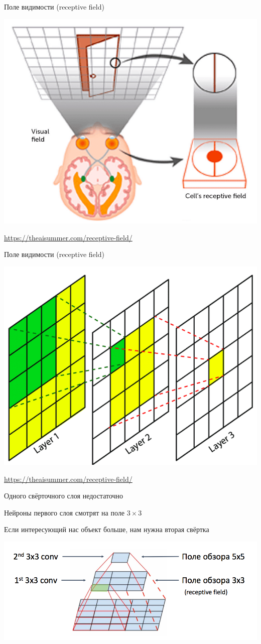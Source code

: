 \documentclass[notes,12pt, aspectratio=169]{beamer}
\newenvironment{wideitemize}{\itemize\addtolength{\itemsep}{10pt}}{\enditemize}
\begin{document}
\begin{frame}{Поле видимости (receptive field)}
\begin{center}
	\includegraphics[width=.5\linewidth]{Visual-human-system.png}
\end{center}
\vfill %
\footnotesize
\color{blue} \url{https://theaisummer.com/receptive-field/}
\end{frame}


\begin{frame}{Поле видимости (receptive field)}
\begin{center}
	\includegraphics[width=.5\linewidth]{receptive-field-in-convolutional-networks.png}
\end{center}
\vfill %
\footnotesize
\color{blue} \url{https://theaisummer.com/receptive-field/}
\end{frame}


\begin{frame}{Одного свёрточного слоя недостаточно}
\begin{wideitemize}
	\item  Нейроны первого слоя смотрят на поле $3 \times 3$ 
	\item  Если интересующий нас объект больше, нам нужна вторая свёртка 
\end{wideitemize}

\begin{center}
	\includegraphics[width=.8\linewidth]{rec_field.png}
\end{center}
\end{frame}
\end{document}
